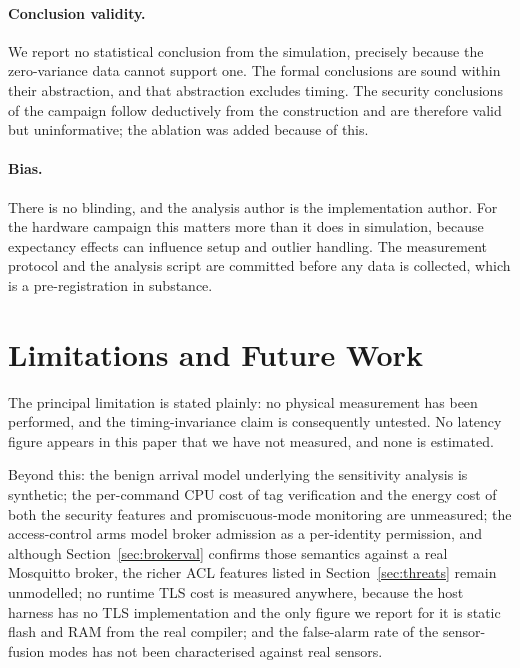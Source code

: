 \paragraph{Conclusion validity.} We report no statistical conclusion from the simulation,
precisely because the zero-variance data cannot support one. The formal conclusions are sound
within their abstraction, and that abstraction excludes timing. The security conclusions of the
campaign follow deductively from the construction and are therefore valid but uninformative;
the ablation was added because of this.

\paragraph{Bias.} There is no blinding, and the analysis author is the implementation author. For
the hardware campaign this matters more than it does in simulation, because expectancy effects
can influence setup and outlier handling. The measurement protocol and the analysis script are
committed before any data is collected, which is a pre-registration in substance.

\section{Limitations and Future Work}\label{sec:limitations}

The principal limitation is stated plainly: no physical measurement has been performed, and the
timing-invariance claim is consequently untested. No latency figure appears in this paper that we
have not measured, and none is estimated.

Beyond this: the benign arrival model underlying the sensitivity analysis is synthetic; the
per-command CPU cost of tag verification and the energy cost of both the security features and
promiscuous-mode monitoring are unmeasured; the access-control arms model broker admission as a
per-identity permission, and although Section~\ref{sec:brokerval} confirms those semantics
against a real Mosquitto broker, the richer ACL features listed in Section~\ref{sec:threats}
remain unmodelled; no runtime TLS cost is measured anywhere, because the
host harness has no TLS implementation and the only figure we report for it is static flash and
RAM from the real compiler; and the false-alarm rate of the sensor-fusion modes has not been
characterised against real sensors.

